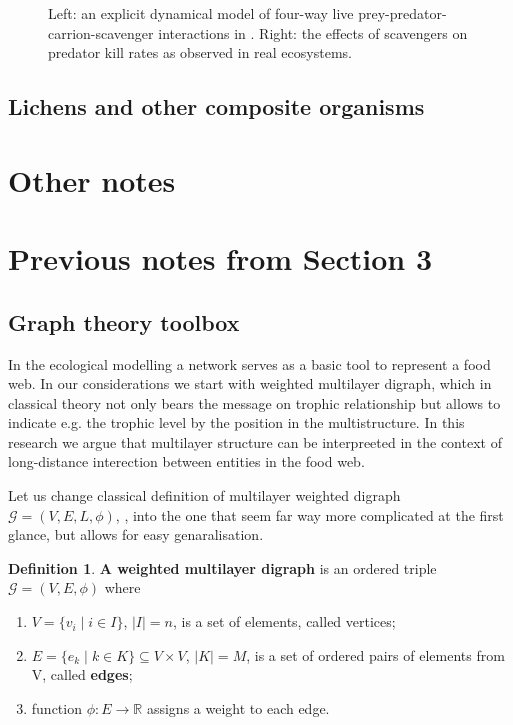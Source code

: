 \documentclass[a4paper,12pt]{article}
\theoremstyle{definition}
\newtheorem{definition}{Definition}%
\theoremstyle{remark}
\begin{document}
\begin{figure}[h!]
	\begin{center}
        \caption{Left: an explicit dynamical model of four-way live prey-predator-carrion-scavenger interactions in \cite{Mellard2021}. Right: the effects of scavengers on predator kill rates as observed in real ecosystems.} 
    	\label{Mellard_fig}
    \end{center}
    \end{figure}  

 
\subsection{Lichens and other composite organisms}

\section{Other notes}

\section{Previous notes from Section 3}


\subsection{Graph theory toolbox}
In the ecological modelling a network serves as a basic tool to represent a food web. In our considerations we start with weighted multilayer digraph, which in classical theory not only bears the message on trophic relationship but allows to indicate e.g. the trophic level by the position in the multistructure. In this research we argue that multilayer structure can be interpreeted in the context of long-distance interection between entities in the food web. 

Let us change classical definition of multilayer weighted digraph $\mathcal{G} = (V,E,L,\phi)$, \cite[Sec.~2.1]{KivArena2014}, into the one that seem far way more complicated at the first glance, but allows for easy genaralisation.

\begin{definition}%
    \label{def: WeightedDigraph}
     \textbf{A weighted multilayer digraph} is an ordered triple $\mathcal{G} = (V,E, \phi)$ where
    \begin{enumerate}
        \item $V = \{v_i\; | \; i \in I\}$, $|I|=n$, is a set of elements, called vertices;
        \item $E = \{e_k\; | \; k \in K\}\subseteq V \times V$, $|K|=M$,   is a set of ordered pairs of elements from V, called \textbf{edges};
        \item function $\phi: E \xrightarrow{} \mathbb{R}$ assigns a weight to each edge.
    \end{enumerate} 
\end{definition}
\end{document}
